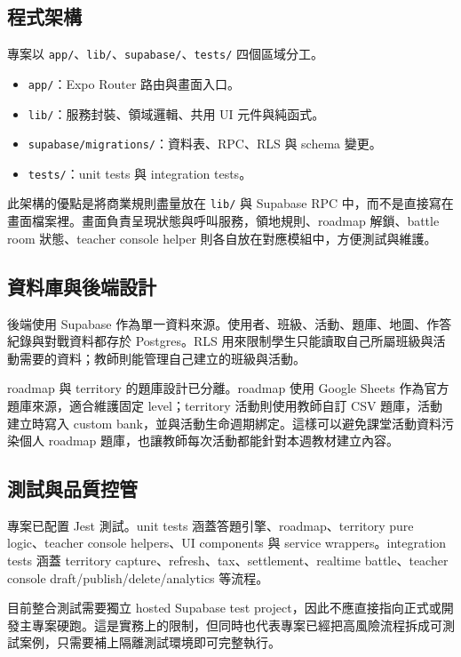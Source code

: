\documentclass[12pt,a4paper]{article}
\begin{document}
\subsection{程式架構}

專案以 \texttt{app/}、\texttt{lib/}、\texttt{supabase/}、\texttt{tests/} 四個區域分工。

\begin{itemize}
  \item \texttt{app/}：Expo Router 路由與畫面入口。
  \item \texttt{lib/}：服務封裝、領域邏輯、共用 UI 元件與純函式。
  \item \texttt{supabase/migrations/}：資料表、RPC、RLS 與 schema 變更。
  \item \texttt{tests/}：unit tests 與 integration tests。
\end{itemize}

此架構的優點是將商業規則盡量放在 \texttt{lib/} 與 Supabase RPC 中，而不是直接寫在畫面檔案裡。畫面負責呈現狀態與呼叫服務，領地規則、roadmap 解鎖、battle room 狀態、teacher console helper 則各自放在對應模組中，方便測試與維護。

\subsection{資料庫與後端設計}

後端使用 Supabase 作為單一資料來源。使用者、班級、活動、題庫、地圖、作答紀錄與對戰資料都存於 Postgres。RLS 用來限制學生只能讀取自己所屬班級與活動需要的資料；教師則能管理自己建立的班級與活動。

roadmap 與 territory 的題庫設計已分離。roadmap 使用 Google Sheets 作為官方題庫來源，適合維護固定 level；territory 活動則使用教師自訂 CSV 題庫，活動建立時寫入 custom bank，並與活動生命週期綁定。這樣可以避免課堂活動資料污染個人 roadmap 題庫，也讓教師每次活動都能針對本週教材建立內容。

\subsection{測試與品質控管}

專案已配置 Jest 測試。unit tests 涵蓋答題引擎、roadmap、territory pure logic、teacher console helpers、UI components 與 service wrappers。integration tests 涵蓋 territory capture、refresh、tax、settlement、realtime battle、teacher console draft/publish/delete/analytics 等流程。

目前整合測試需要獨立 hosted Supabase test project，因此不應直接指向正式或開發主專案硬跑。這是實務上的限制，但同時也代表專案已經把高風險流程拆成可測試案例，只需要補上隔離測試環境即可完整執行。
\end{document}
